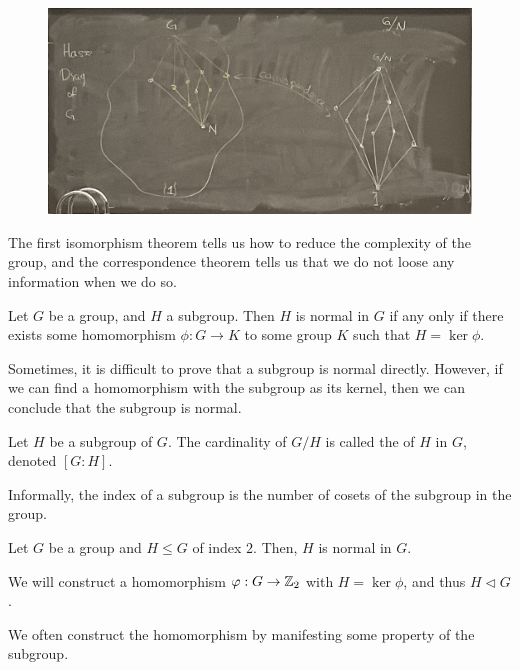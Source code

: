 \begin{figure}[ht!]
    \centering

    \includegraphics[width=0.67\linewidth]{figures/correspondence-theorem.png}
\end{figure}

The first isomorphism theorem tells us how to reduce the complexity of the group, and the correspondence theorem tells us that we do not loose any information when we do so.

\begin{proposition}
    Let $G$ be a group, and $H$ a subgroup. Then $H$ is normal in $G$ if any only if there exists some homomorphism $\phi: G \to K$ to some group $K$ such that $H = \ker{\phi}$.
\end{proposition}

\begin{remark}
    Sometimes, it is difficult to prove that a subgroup is normal directly. However, if we can find a homomorphism with the subgroup as its kernel, then we can conclude that the subgroup is normal.
\end{remark}

\begin{definition}[Index]\label{def:index}
    Let $H$ be a subgroup of $G$. The cardinality of $G/H$ is called the  of $H$ in $G$, denoted $[G:H]$.
\end{definition}

Informally, the index of a subgroup is the number of cosets of the subgroup in the group.

\begin{theorem}
    Let $G$ be a group and $H \le G$ of index $2$. Then, $H$ is normal in $G$.
\end{theorem}

We will construct a homomorphism $\varphi: G \to \mathbb{Z}_2$ with $H = \ker{\phi}$, and thus $H \triangleleft G$.

\begin{remark}
    We often construct the homomorphism by manifesting some property of the subgroup.
\end{remark}

